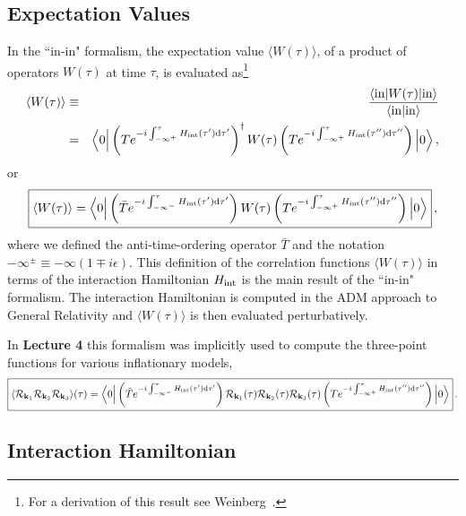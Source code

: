 \documentclass[12pt,letterpaper,rotate]{article}
\def\beq{\begin{equation}}
\def\eeq{\end{equation}}
\def\bea{\begin{eqnarray}}
\def\eea{\end{eqnarray}}
\def\d{{\rm d}}
\def\R{{\cal R}}
\begin{document}
{\subsection{Expectation Values}

In the ``in-in" formalism, the expectation value $\langle W(\tau) \rangle$, of a product of operators $W(\tau)$ at time $\tau$, is evaluated as\footnote{For a derivation of this result see Weinberg~\cite{Weinberg:2005vy}.}
\bea
\langle W(\tau) \rangle & \equiv & \frac{\langle {\rm in} | W(\tau) | {\rm in} \rangle}{\langle {\rm in} | {\rm in} \rangle} \\
&=& \Bigl\langle 0 \Bigr| \left( T e^{-i \int_{-\infty^+}^\tau H_{\rm int}(\tau') \d \tau'} \right)^\dagger W(\tau)  \left( T e^{-i \int_{-\infty^+}^\tau H_{\rm int}(\tau'') \d \tau''} \right) \Bigl|0 \Bigr\rangle \, ,
\eea
or 
\beq
\fbox{$\displaystyle
\langle W(\tau) \rangle = \Bigl\langle 0 \Bigr| \left( \bar T e^{-i \int_{-\infty^-}^\tau H_{\rm int}(\tau') \d \tau'} \right) W(\tau)  \left( T e^{-i \int_{-\infty^+}^\tau H_{\rm int}(\tau'') \d \tau''} \right) \Bigl|0 \Bigr\rangle $} \, ,
\eeq
where we defined the anti-time-ordering operator $\bar T$ and the notation $- \infty^\pm \equiv - \infty(1 \mp i \epsilon)$.
This definition of the correlation functions $\langle W(\tau) \rangle$ in terms of the interaction Hamiltonian $H_{\rm int}$ is the main result of the ``in-in" formalism.
The interaction Hamiltonian is computed in the ADM approach to General Relativity \cite{malda} and $\langle W(\tau) \rangle$ is then evaluated perturbatively.

In {\bf Lecture 4} this formalism was implicitly used to compute the three-point functions for various inflationary models,
\beq
\label{equ:inin}
\fbox{$\displaystyle
\langle \R_{{\bf k}_1} \R_{{\bf k}_2} \R_{{\bf k}_3}\rangle(\tau)  =  \Bigl\langle 0 \Bigr| \left( \bar T e^{-i \int_{-\infty^-}^\tau H_{\rm int}(\tau') \d \tau'} \right)  \R_{{\bf k}_1}(\tau) \R_{{\bf k}_2}(\tau) \R_{{\bf k}_3}(\tau)  \left( T e^{-i \int_{-\infty^+}^\tau H_{\rm int}(\tau'') \d \tau''} \right) \Bigl|0 \Bigr\rangle $}\, .
\eeq


\subsection{Interaction Hamiltonian}

}
\end{document}
